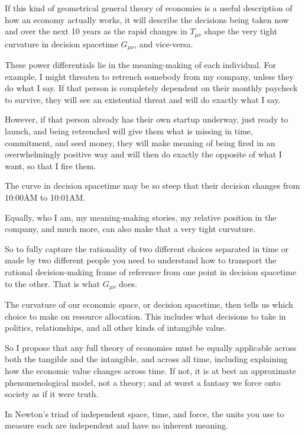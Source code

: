 If this kind of geometrical general theory of economies is a useful description of how an economy actually works, it will describe the decisions being taken now and over the next 10 years as the rapid changes in $T_{\mu\nu}$ shape the very tight curvature in decision spacetime $G_{\mu\nu}$, and vice-versa.


These power  differentials lie in the meaning\hyp{}making of each individual. For example, I might threaten to retrench somebody from my company, unless they do what I say. If that person is completely dependent on their monthly paycheck to survive, they will see an existential threat and will do exactly what I say.


However, if that person already has their own startup underway, just ready to launch, and being retrenched will give them what is missing in time, commitment, and seed money, they will make meaning of being fired in an overwhelmingly positive way and will then do exactly the opposite of what I want, so that I fire them.


The curve in decision spacetime may be so steep that their decision changes from 10:00AM to 10:01AM.


Equally, who I am, my meaning\hyp{}making stories, my relative position in the company, and much more, can also make that a very tight curvature.


So to fully capture the rationality of two different choices separated in time or made by two different people you need to understand how to transport the rational decision\hyp{}making frame of reference from one point in decision spacetime to the other. That is what $G_{\mu\nu}$ does.


The curvature of our economic space, or decision spacetime, then tells us which choice to make on resource allocation. This includes what decisions to take in politics, relationships, and all other kinds of intangible value.


So I propose that any full theory of economies must be equally applicable across both the tangible and the intangible, and across all time, including explaining how the economic value changes across time. If not, it is at best an approximate phenomenological model, not a theory; and at worst a fantasy we force onto society as if it were truth.


In Newton's triad of independent space, time, and force, the units you use to measure each are independent and have no inherent meaning. 



